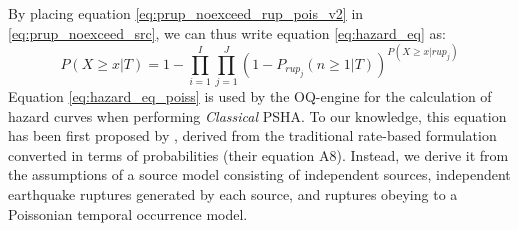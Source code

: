 By placing equation \ref{eq:prup_noexceed_rup_pois_v2} in \ref{eq:prup_noexceed_src}, we can thus
write equation \ref{eq:hazard_eq} as:
\begin{equation}
\label{eq:hazard_eq_poiss}
P(X \ge x | T) =  1 - \prod_{i=1}^{I} \prod_{j=1}^{J} (1 - P_{rup_{j}}(n \ge 1 | T))^{P(X \ge x | rup_{j})}
\end{equation}
Equation \ref{eq:hazard_eq_poiss} is used by the OQ-engine for the calculation of hazard curves when performing
\textit{Classical} PSHA. To our knowledge, this equation has been first proposed by \cite{field2003},
derived from the traditional rate-based formulation converted in terms of probabilities (their equation A8).
Instead, we derive it from the assumptions of a source model consisting of independent sources, independent
earthquake ruptures generated by each source, and ruptures obeying to a Poissonian temporal occurrence model.

